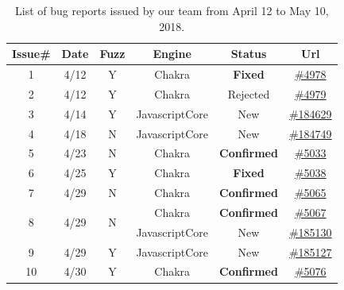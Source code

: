 \documentclass[11pt]{article}
\begin{document}
\newcommand{\checkm}{Y}
\newcommand{\crossmark}{N}
\begin{table}
  \vspace{-4ex}
  \scriptsize
  \centering
  \caption{List of bug reports issued by our team from April 12 to May
    10, 2018.}
  \label{tab:bugs}
  \begin{tabular}{cccccc}
    \toprule
    Issue\#    & Date & Fuzz & Engine  & Status  & \multicolumn{1}{c}{Url}   \\
    \midrule    
    1  & 4/12 & \checkm & Chakra   & \textbf{Fixed}  & \href{https://github.com/Microsoft/ChakraCore/issues/4978}{\#4978}      \\ 
    2  & 4/12 & \checkm & Chakra   & Rejected  & \href{https://github.com/Microsoft/ChakraCore/issues/4979}{\#4979}      \\
    3  & 4/14 & \checkm & JavascriptCore  & New & \href{https://bugs.webkit.org/show\_bug.cgi?id=184629}{\#184629}        \\
    4  & 4/18 & \crossmark & JavascriptCore  & New  & \href{https://bugs.webkit.org/show\_bug.cgi?id=184749}{\#184749}        \\
    5  & 4/23 & \crossmark & Chakra  & \textbf{Confirmed}  & \href{https://github.com/Microsoft/ChakraCore/issues/5033}{\#5033}       \\
    6  & 4/25 & \checkm & Chakra  & \textbf{Fixed}     & \href{https://github.com/Microsoft/ChakraCore/issues/5038}{\#5038}      \\
    7  & 4/29 & \crossmark & Chakra  & \textbf{Confirmed}   &
    \href{https://github.com/Microsoft/ChakraCore/issues/5065}{\#5065}
    \\
    \midrule
    \multirow{2}{*}{8}  & \multirow{2}{*}{4/29} &  \multirow{2}{*}{\crossmark} & Chakra & \textbf{Confirmed} &    \href{https://github.com/Microsoft/ChakraCore/issues/5067}{\#5067} \\
                        & \checkm &                       &
    JavascriptCore & New &    \href{https://bugs.webkit.org/show\_bug.cgi?id=185130}{\#185130}    \\
    \midrule    
    9  & 4/29 & \checkm & JavascriptCore  & New  &    \href{https://bugs.webkit.org/show\_bug.cgi?id=185127}{\#185127}    \\
    \midrule    
    \multirow{2}{*}{10} & \multirow{2}{*}{4/30}  & \multirow{2}{*}{\checkm} & Chakra & \textbf{Confirmed} &    \href{https://github.com/Microsoft/ChakraCore/issues/5076}{\#5076} \\    

\end{tabular}
\end{table}
\end{document}
